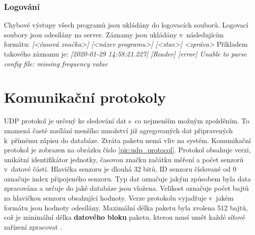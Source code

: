 \subsubsection*{Logování}
Chybové výstupy všech programů jsou ukládány do logovacích souborů. Logovací soubory jsou odesílány na server. Záznamy jsou ukládány v~následujícím formátu: \textit{[<časová značka>] [<název programu>] [<stav>] <zpráva>} Příkladem takového záznamu je: \textit{[2020-01-29 14:58:21.227] [Reader] [error] Unable to parse config file: missing frequency value}

\section{Komunikační protokoly}\label{sec:comm_protocol}
UDP protokol je určený ke sledování dat s~co nejmenším možným zpožděním. To znamená časté zasílání menšího množství již agregovaných dat připravených k~přímému zápisu do databáze. Ztráta paketu nemá vliv na systém. Komunikační protokol je zobrazen na obrázku číslo \ref{pic:udp_protocol}. Protokol obsahuje verzi, unikátní identifikátor jednotky, časovou značku začátku měření a počet senzorů v~datové části. Hlavička senzoru je dlouhá 32 bitů. ID senzoru číslované od $0$ označuje index připojeného senzoru. Typ dat označuje jakým způsobem byla data zpracována a určuje do jaké databáze jsou vložena. Velikost označuje počet bajtů za hlavičkou senzoru obsahující hodnoty. Verze protokolu vyjadřuje v~jakém formátu jsou hodnoty odesílány. Maximální délka paketu byla zvolena 512 bajtů, což je minimální délka \textbf{datového bloku} paketu, kterou musí umět každé síťové zařízení zpracovat \cite{rfc791}. 

